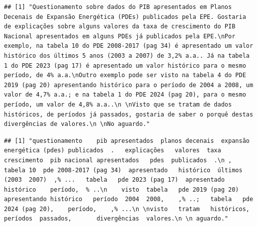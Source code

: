 \documentclass[]{article}
\newenvironment{Shaded}{\begin{snugshade}}{\end{snugshade}}
\newcommand{\CommentTok}[1]{\textcolor[rgb]{0.56,0.35,0.01}{\textit{#1}}}
\newcommand{\DecValTok}[1]{\textcolor[rgb]{0.00,0.00,0.81}{#1}}
\newcommand{\NormalTok}[1]{#1}
\newcommand{\OperatorTok}[1]{\textcolor[rgb]{0.81,0.36,0.00}{\textbf{#1}}}
\begin{document}
\begin{Shaded}
\end{Shaded}

\begin{verbatim}
## [1] "Questionamento sobre dados do PIB apresentados em Planos Decenais de Expansão Energética (PDEs) publicados pela EPE. Gostaria de explicações sobre alguns valores da taxa de crescimento do PIB Nacional apresentados em alguns PDEs já publicados pela EPE.\nPor exemplo, na tabela 10 do PDE 2008-2017 (pag 34) é apresentado um valor histórico dos últimos 5 anos (2003 a 2007) de 3,2% a.a.. Já na tabela 1 do PDE 2023 (pag 17) é apresentado um valor histórico para o mesmo período, de 4% a.a.\nOutro exemplo pode ser visto na tabela 4 do PDE 2019 (pag 20) apresentando histórico para o período de 2004 a 2008, um valor de 4,7% a.a.; e na tabela 1 do PDE 2024 (pag 20), para o mesmo período, um valor de 4,8% a.a..\n \nVisto que se tratam de dados históricos, de períodos já passados, gostaria de saber o porquê destas divergências de valores.\n \nNo aguardo."
\end{verbatim}

\begin{Shaded}
\end{Shaded}

\begin{verbatim}
## [1] "questionamento    pib apresentados  planos decenais  expansão energética (pdes) publicados  .   explicações   valores  taxa  crescimento  pib nacional apresentados   pdes  publicados  .\n ,  tabela 10  pde 2008-2017 (pag 34)  apresentado   histórico  últimos   (2003  2007)  ,% ...   tabela   pde 2023 (pag 17)  apresentado   histórico    período,  % ..\n    visto  tabela   pde 2019 (pag 20) apresentando histórico   período  2004  2008,    ,% ..;   tabela   pde 2024 (pag 20),    período,    ,% ...\n \nvisto   tratam   históricos,  períodos  passados,       divergências  valores.\n \n aguardo."
\end{verbatim}

\begin{Shaded}
\end{Shaded}
\end{document}

